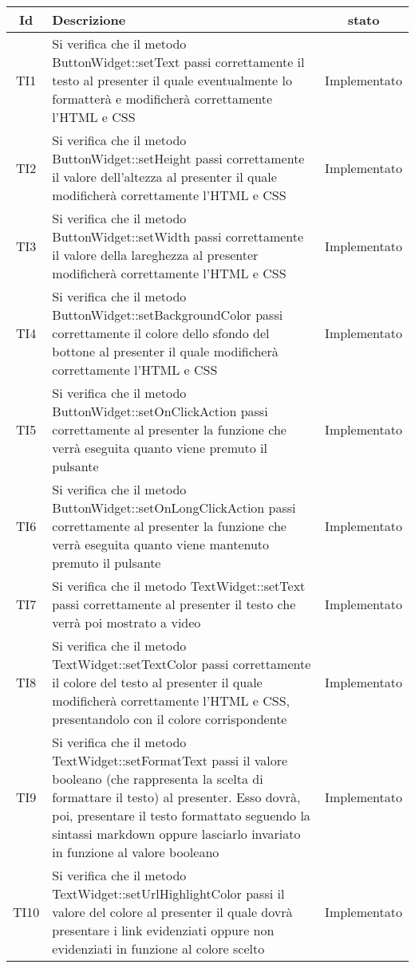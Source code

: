 \begin{center}
	\begin{longtable}{|c|>{\centering}m{10cm}|c|}\hline
		Id & Descrizione & stato \\ \hline
		TI1 & Si verifica che il metodo ButtonWidget::setText passi correttamente il testo al presenter il quale eventualmente lo formatterà e modificherà correttamente l'HTML e CSS & Implementato \\ \hline
		TI2 & Si verifica che il metodo ButtonWidget::setHeight passi correttamente il valore dell'altezza al presenter il quale modificherà correttamente l'HTML e CSS & Implementato \\ \hline
		TI3 & Si verifica che il metodo ButtonWidget::setWidth passi correttamente il valore della lareghezza al presenter modificherà correttamente l'HTML e CSS & Implementato \\ \hline
		TI4 & Si verifica che il metodo ButtonWidget::setBackgroundColor passi correttamente il colore dello sfondo del bottone al presenter il quale modificherà correttamente l'HTML e CSS & Implementato \\ \hline
		TI5 & Si verifica che il metodo ButtonWidget::setOnClickAction passi correttamente al presenter la funzione che verrà eseguita quanto viene premuto il pulsante & Implementato \\ \hline
		TI6 & Si verifica che il metodo ButtonWidget::setOnLongClickAction passi correttamente al presenter la funzione che verrà eseguita quanto viene mantenuto premuto il pulsante & Implementato \\ \hline
		TI7 & Si verifica che il metodo TextWidget::setText passi correttamente al presenter il testo che verrà poi mostrato a video & Implementato \\ \hline
		TI8 & Si verifica che il metodo TextWidget::setTextColor passi correttamente il colore del testo al presenter il quale modificherà correttamente l'HTML e CSS, presentandolo con il colore corrispondente & Implementato \\ \hline
		TI9 & Si verifica che il metodo TextWidget::setFormatText passi il valore booleano (che rappresenta la scelta di formattare il testo) al presenter. Esso dovrà, poi, presentare il testo formattato seguendo la sintassi markdown oppure lasciarlo invariato in funzione al valore booleano & Implementato \\ \hline
		TI10 & Si verifica che il metodo TextWidget::setUrlHighlightColor passi il valore del colore al presenter il quale dovrà presentare i link evidenziati oppure non evidenziati in funzione al colore scelto & Implementato \\ \hline

\end{longtable}
\end{center}
